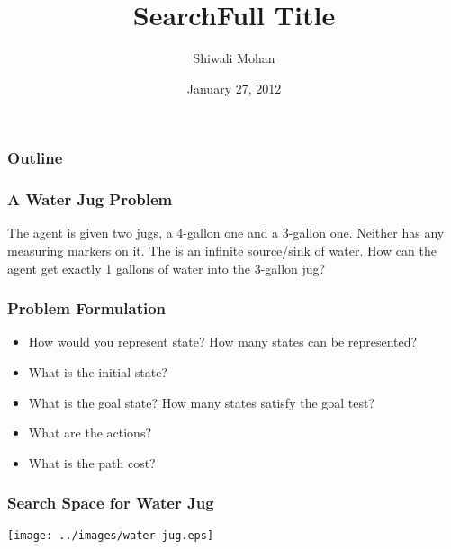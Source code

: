 \documentclass[compress, 9pt]{beamer}
\institute{Computer Science and Engineering \\ University of Michigan}
\title{Search}
\author{Shiwali Mohan}
\date{January 27, 2012}
\begin{document}
\maketitle

\begin{frame}
\frametitle{Outline}
\setcounter{tocdepth}{3}
\tableofcontents
\end{frame}


\title[Search \hspace{1em}\insertframenumber/
\inserttotalframenumber]{Full Title}



\begin{frame}
\frametitle{A Water Jug Problem}
\label{sec-1}

The agent is given two jugs, a 4-gallon one and a 3-gallon
one. Neither has any measuring markers on it. The is an infinite
source/sink of water. How can the agent get exactly 1 gallons of water
into the 3-gallon jug?
\end{frame}
\begin{frame}
\frametitle{Problem Formulation}
\label{sec-2}

\begin{itemize}
\item How would you represent state? How many states can be represented?
\item What is the initial state?
\item What is the goal state? How many states satisfy the goal test?
\item What are the actions?
\item What is the path cost?
\end{itemize}
\end{frame}
\begin{frame}
\frametitle{Search Space for Water Jug}
\label{sec-3}

\centering
\texttt{[image: ../images/water-jug.eps]}
\end{frame}
\end{document}
